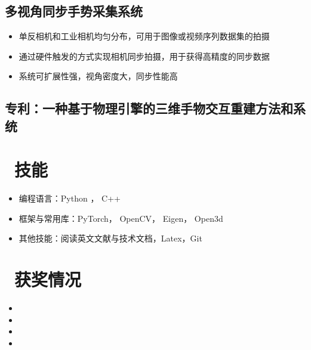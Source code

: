 \documentclass{resume}
\begin{document}
\subsection{\textbf{多视角同步手势采集系统}}
\begin{itemize}
  \item 单反相机和工业相机均匀分布，可用于图像或视频序列数据集的拍摄
  \item 通过硬件触发的方式实现相机同步拍摄，用于获得高精度的同步数据
  \item 系统可扩展性强，视角密度大，同步性能高
\end{itemize}

\subsection{\textbf{专利：一种基于物理引擎的三维手物交互重建方法和系统}}
\vspace{2mm}

\section{\faCogs\ 技能}
\begin{itemize} [parsep=0.5ex]
  \item 编程语言：Python ， C++
  \item 框架与常用库：PyTorch， OpenCV， Eigen， Open3d
  \item 其他技能：阅读英文文献与技术文档，Latex，Git
\end{itemize}

\section{\faTrophy\ 获奖情况}
\begin{itemize}
    \item{}
    \item{}
    \item{}
    \item {}
\end{itemize}
\end{document}
